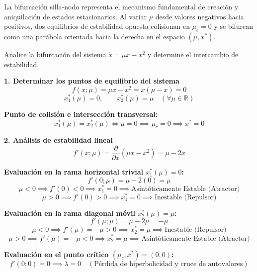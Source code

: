 \documentclass[11pt,a4paper]{article}
\newenvironment{solucion}[1][Solución Detallada]{%
    \vspace{1.5mm}%
    \noindent{\large\textbf{Solución:}}\par\vspace{1.5mm}%
}{%
    \par\vspace{3mm}%
}
\newenvironment{conclusion}[1][Interpretación Dinámica y Conclusión]{%
    \vspace{2mm}%
    \noindent{\large\textbf{Conclusión:}}\par\vspace{1.5mm}%
}{%
    \par\vspace{3mm}%
}
\begin{document}
\begin{conclusion}
La bifurcación silla-nodo representa el mecanismo fundamental de creación y aniquilación de estados estacionarios. Al variar $\mu$ desde valores negativos hacia positivos, dos equilibrios de estabilidad opuesta colisionan en $\mu_c = 0$ y se bifurcan como una parábola orientada hacia la derecha en el espacio $(\mu, x^*)$.
\end{conclusion}

\vspace{3mm}

\begin{problema}[Problema 3.2]
Analice la bifurcación del sistema $\dot{x} = \mu x - x^2$ y determine el intercambio de estabilidad.
\end{problema}

\begin{solucion}

\textbf{\large 1. Determinar los puntos de equilibrio del sistema}
\[
f(x; \mu) = \mu x - x^2 = x(\mu - x) = 0
\]
\[
\boxed{x_1^*(\mu) = 0, \qquad x_2^*(\mu) = \mu \quad (\forall \mu \in \mathbb{R})}
\]

\textbf{Punto de colisión e intersección transversal:}
\[
x_1^*(\mu) = x_2^*(\mu) \iff \mu = 0 \implies \boxed{\mu_c = 0 \implies x^* = 0}
\]

\vspace{3.5mm}

\textbf{\large 2. Análisis de estabilidad lineal}
\[
f'(x; \mu) = \frac{\partial}{\partial x}\left(\mu x - x^2\right) = \mu - 2x
\]

\textbf{Evaluación en la rama horizontal trivial $x_1^*(\mu) = 0$:}
\[
f'(0; \mu) = \mu - 2(0) = \mu
\]
\[
\mu < 0 \implies f'(0) < 0 \implies \boxed{x_1^* = 0 \implies \text{Asintóticamente Estable (Atractor)}}
\]
\[
\mu > 0 \implies f'(0) > 0 \implies \boxed{x_1^* = 0 \implies \text{Inestable (Repulsor)}}
\]

\textbf{Evaluación en la rama diagonal móvil $x_2^*(\mu) = \mu$:}
\[
f'(\mu; \mu) = \mu - 2\mu = -\mu
\]
\[
\mu < 0 \implies f'(\mu) = -\mu > 0 \implies \boxed{x_2^* = \mu \implies \text{Inestable (Repulsor)}}
\]
\[
\mu > 0 \implies f'(\mu) = -\mu < 0 \implies \boxed{x_2^* = \mu \implies \text{Asintóticamente Estable (Atractor)}}
\]

\textbf{Evaluación en el punto crítico $(\mu_c, x^*) = (0, 0)$:}
\[
f'(0; 0) = 0 \implies \boxed{\lambda = 0 \quad (\text{Pérdida de hiperbolicidad y cruce de autovalores})}
\]

\vspace{3.5mm}


\end{solucion}
\end{document}
